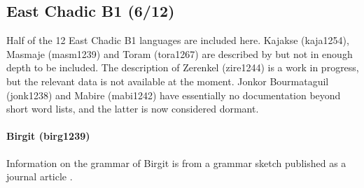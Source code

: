 
\subsection{East Chadic B1 (6/12)}

Half of the 12 East Chadic B1 languages are included here. Kajakse (kaja1254), Masmaje (masm1239) and Toram (tora1267) are described by \citet{alioPreliminariesEtudeLangue2004} but not in enough depth to be included. The description of Zerenkel (zire1244) is a work in progress, but the relevant data is not available at the moment. Jonkor Bourmataguil (jonk1238) and Mabire (mabi1242) have essentially no documentation beyond short word lists, and the latter is now considered dormant. 

\paragraph*{Birgit (birg1239)}

Information on the grammar of Birgit is from a grammar sketch published as a journal article \citep{jungraithmayrBirgitOsttschadischeSprache2004}. 

